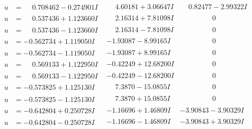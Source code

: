 \documentclass[1p]{elsarticle_modified}
\theoremstyle{definition}
\begin{document}
$$\begin{array}{c|c|c}
\begin{aligned}
u &= \phantom{-}0.708462 - 0.274901 I\end{aligned}
 & \phantom{-}4.60181 + 3.06647 I & \phantom{-}0.82477 - 2.99322 I \\ \hline\begin{aligned}
u &= \phantom{-}0.537436 + 1.123660 I\end{aligned}
 & \phantom{-}2.16314 + 7.81098 I & \phantom{-0.000000 } 0 \\ \hline\begin{aligned}
u &= \phantom{-}0.537436 - 1.123660 I\end{aligned}
 & \phantom{-}2.16314 - 7.81098 I & \phantom{-0.000000 } 0 \\ \hline\begin{aligned}
u &= -0.562734 + 1.119050 I\end{aligned}
 & -1.93087 - 8.99165 I & \phantom{-0.000000 } 0 \\ \hline\begin{aligned}
u &= -0.562734 - 1.119050 I\end{aligned}
 & -1.93087 + 8.99165 I & \phantom{-0.000000 } 0 \\ \hline\begin{aligned}
u &= \phantom{-}0.569133 + 1.122950 I\end{aligned}
 & -0.42249 + 12.68200 I & \phantom{-0.000000 } 0 \\ \hline\begin{aligned}
u &= \phantom{-}0.569133 - 1.122950 I\end{aligned}
 & -0.42249 - 12.68200 I & \phantom{-0.000000 } 0 \\ \hline\begin{aligned}
u &= -0.573825 + 1.125130 I\end{aligned}
 & \phantom{-}7.3870 - 15.0855 I & \phantom{-0.000000 } 0 \\ \hline\begin{aligned}
u &= -0.573825 - 1.125130 I\end{aligned}
 & \phantom{-}7.3870 + 15.0855 I & \phantom{-0.000000 } 0 \\ \hline\begin{aligned}
u &= -0.642804 + 0.250728 I\end{aligned}
 & -1.16696 + 1.46809 I & -3.90843 - 3.90329 I \\ \hline\begin{aligned}
u &= -0.642804 - 0.250728 I\end{aligned}
 & -1.16696 - 1.46809 I & -3.90843 + 3.90329 I \\ \hline\begin{aligned}

\end{aligned}
\end{array}$$
\end{document}

